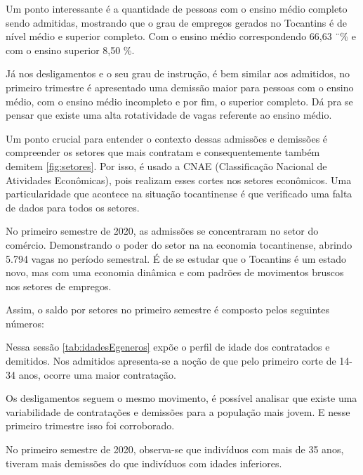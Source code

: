 \par Um ponto interessante é a quantidade de pessoas com o ensino médio completo sendo admitidas, mostrando que o grau de empregos gerados no Tocantins é de nível médio e superior completo. Com o ensino médio correspondendo 66,63 ¨\% e com o ensino superior 8,50 \%.

\par Já nos desligamentos e o seu grau de instrução, é bem similar aos admitidos, no primeiro trimestre é apresentado uma demissão maior para pessoas com o ensino médio, com o ensino médio incompleto e por fim, o superior completo. Dá pra se pensar que existe uma alta rotatividade de vagas referente ao ensino médio.

\par Um ponto crucial para entender o contexto dessas admissões e demissões é compreender os setores que mais contratam e consequentemente também demitem \ref{fig:setores}. Por isso, é usado a CNAE (Classificação Nacional de Atividades Econômicas), pois realizam esses cortes nos setores econômicos. Uma particularidade que acontece na situação tocantinense é que verificado uma falta de dados para todos os setores.


\par No primeiro semestre de 2020, as admissões se concentraram no setor do comércio. Demonstrando o poder do setor na na economia tocantinense, abrindo 5.794 vagas no período semestral. É de se estudar que o Tocantins é um estado novo, mas com uma economia dinâmica e com padrões de movimentos bruscos nos setores de empregos. 
\par Assim, o saldo por setores no primeiro semestre é composto pelos seguintes números:



\par Nessa sessão \ref{tab:idadesEgeneros} expõe o perfil de idade dos contratados e demitidos. Nos admitidos apresenta-se a noção de que pelo primeiro corte de 14-34 anos, ocorre uma maior contratação.


\par Os desligamentos seguem o mesmo movimento, é possível analisar que existe uma variabilidade de contratações e demissões para a população mais jovem. E nesse primeiro trimestre isso foi corroborado. 


\par No primeiro semestre de 2020, observa-se que indivíduos com mais de 35 anos, tiveram mais demissões do que indivíduos com idades inferiores.

